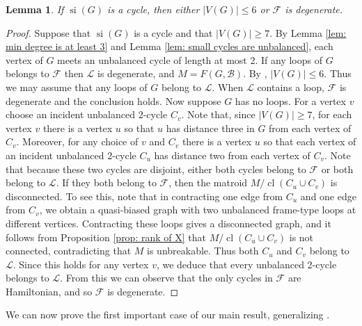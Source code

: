 \documentclass[12pt]{article}
\newtheorem{lemma}[theorem]{Lemma}
\theoremstyle{definition}
\theoremstyle{plain} %
\newcommand{\cB}{\mathcal{B}}
\newcommand{\cF}{\mathcal{F}}
\newcommand{\cL}{\mathcal{L}}
\DeclareMathOperator{\si}{si}
\DeclareMathOperator{\cl}{cl}
\begin{document}
\begin{lemma} \label{lem: si(G) is a cycle}
If $\si(G)$ is a cycle, then either $\lvert V(G)\rvert\leq6$ or $\cF$ is degenerate. 
\end{lemma}
\begin{proof}
Suppose that $\si(G)$ is a cycle and that $\lvert V(G)\rvert\geq7$. By Lemma \ref{lem: min degree is at least 3} and Lemma \ref{lem: small cycles are unbalanced}, each vertex of $G$ meets an unbalanced cycle of length at most 2. If any loops of $G$ belongs to $\cF$ then $\cL$ is degenerate, and $M=F(G,\cB)$. By \cite[Lemma 3.4]{Fife-Mayhew-Oxley-Semple2020}, $|V(G)|\leq 6$. Thus we may assume that any loops of $G$ belong to $\cL$. When $\cL$ contains a loop, $\cF$ is degenerate and the conclusion holds. Now suppose $G$ has no loops. For a vertex $v$ choose an incident unbalanced 2-cycle $C_v$. Note that, since $\lvert V(G)\rvert\geq7$, for each vertex $v$ there is a vertex $u$ so that $u$ has distance three in $G$ from each vertex of $C_v$. Moreover, for any choice of $v$ and $C_v$ there is a vertex $u$ so that each vertex of an incident unbalanced 2-cycle $C_u$ has distance two from each vertex of $C_v$. Note that because these two cycles are disjoint, either both cycles belong to $\cF$ or both belong to $\cL$. If they both belong to $\cF$, then the matroid $M/\cl(C_u\cup C_v)$ is disconnected. To see this, note that in contracting one edge from $C_u$ and one edge from $C_v$, we obtain a quasi-biased graph with two unbalanced frame-type loops at different vertices. Contracting these loops gives a disconnected graph, and it follows from Proposition \ref{prop: rank of X} that $M/\cl(C_u\cup C_v)$ is not connected, contradicting that $M$ is unbreakable. Thus both $C_u$ and $C_v$ belong to $\cL$. Since this holds for any vertex $v$, we deduce that every unbalanced 2-cycle belongs to $\cL$. From this we can observe that the only cycles in $\cF$ are Hamiltonian, and so $\cF$ is degenerate. 
\end{proof}


We can now prove the first important case of our main result, generalizing \cite[Theorem 3.5]{Fife-Mayhew-Oxley-Semple2020}.
\end{document}
